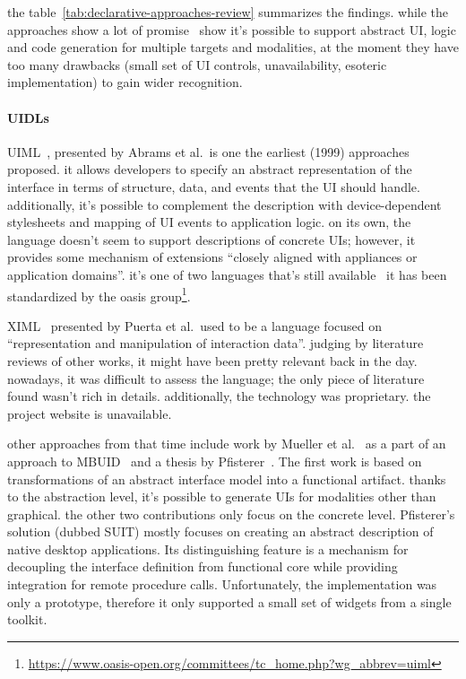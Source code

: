 the table~\ref{tab:declarative-approaches-review} summarizes the findings.
while the approaches show a lot of promise \textemdash\ show it's possible to support abstract UI, logic and code generation for multiple targets and modalities, at the moment they have too many drawbacks (small set of UI controls, unavailability, esoteric implementation) to gain wider recognition.

\paragraph{UIDLs}

UIML~\cite{Abrams1999-ei}, presented by Abrams et al.\ is one the earliest (1999) approaches proposed.
it allows developers to specify an abstract representation of the interface in terms of structure, data, and events that the UI should handle.
additionally, it's possible to complement the description with device-dependent stylesheets and mapping of UI events to application logic.
on its own, the language doesn't seem to support descriptions of concrete UIs;
however, it provides some mechanism of extensions \enquote{closely aligned with appliances or application domains}.
it's one of two languages that's still available \textemdash\ it has been standardized by the oasis group\footnote{\url{https://www.oasis-open.org/committees/tc_home.php?wg_abbrev=uiml}}.

XIML~\cite{puerta2001ximl} presented by Puerta et al.\ used to be a language focused on \enquote{representation and manipulation of interaction data}.
judging by literature reviews of other works, it might have been pretty relevant back in the day.
nowadays, it was difficult to assess the language;
the only piece of literature found wasn't rich in details.
additionally, the technology was proprietary.
the project website is unavailable.

other approaches from that time include work by Mueller et al.~\cite{Mueller2001-un} as a part of an approach to MBUID~\cite{elwert1995Modelling} and a thesis by Pfisterer~\cite{pfistererSemantic2002}.
The first work is based on transformations of an abstract interface model into a functional artifact.
thanks to the abstraction level, it's possible to generate UIs for modalities other than graphical.
the other two contributions only focus on the concrete level.
Pfisterer's solution (dubbed SUIT) mostly focuses on creating an abstract description of native desktop applications.
Its distinguishing feature is a mechanism for decoupling the interface definition from functional core while providing integration for remote procedure calls.
Unfortunately, the implementation was only a prototype, therefore it only supported a small set of widgets from a single toolkit.

